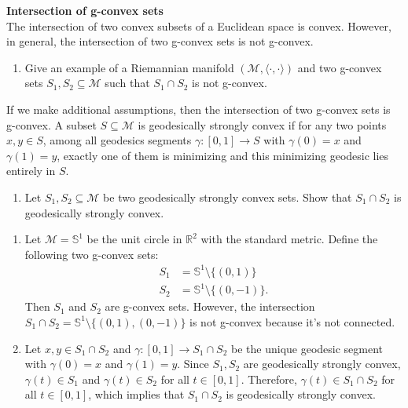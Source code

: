 \documentclass[en, oneside]{assignment}
\begin{document}
\begin{prob} \textbf{Intersection of g-convex sets}\\
    The intersection of two convex subsets of a Euclidean space is convex. However, in general, the intersection of two g-convex sets is not g-convex.
    \begin{enumerate}[label=(\arabic*)]
        \item Give an example of a Riemannian manifold $(\mathcal M, \langle \cdot, \cdot \rangle)$ and 
        two g-convex sets $S_1, S_2 \subseteq \mathcal M$ such that $S_1 \cap S_2$ is not g-convex.
    \end{enumerate}
    If we make additional assumptions, then the intersection of two g-convex sets is g-convex. 
    A subset $S \subseteq \mathcal M$ is geodesically strongly convex if for any two points $x, y \in S$, 
    among all geodesics segments $\gamma : [0, 1] \rightarrow S$ with $\gamma(0) = x$ and $\gamma(1) = y$, 
    exactly one of them is minimizing and this minimizing geodesic lies entirely in $S$.
    \begin{enumerate}[label=(\arabic*), resume]
        \item Let $S_1, S_2 \subseteq \mathcal M$ be two geodesically strongly convex sets. Show that $S_1 \cap S_2$ is geodesically strongly convex.
    \end{enumerate}
    
\end{prob}

\begin{sol}
    \begin{enumerate}[label=(\arabic*)]
        \item Let $\mathcal M = \mathbb S ^1$ be the unit circle in $\mathbb R^2$ with the standard metric. Define the following two g-convex sets:
        \begin{align*}
            S_1 &= \mathbb S ^1 \setminus \{(0, 1)\}\\
            S_2 &= \mathbb S ^1 \setminus \{(0, -1)\}.
        \end{align*}
        Then $S_1$ and $S_2$ are g-convex sets. However, the intersection $S_1 \cap S_2 = \mathbb S ^1 \setminus \{(0, 1), (0, -1)\}$ is not g-convex 
        because it's not connected.
        \item Let $x, y \in S_1 \cap S_2$ and $\gamma : [0, 1] \rightarrow S_1 \cap S_2$ be the unique geodesic segment with $\gamma(0) = x$ and $\gamma(1) = y$.
        Since $S_1, S_2$ are geodesically strongly convex, $\gamma(t) \in S_1$ and $\gamma(t) \in S_2$ for all $t \in [0, 1]$. 
        Therefore, $\gamma(t) \in S_1 \cap S_2$ for all $t \in [0, 1]$, which implies that $S_1 \cap S_2$ is geodesically strongly convex.
    \end{enumerate}
\end{sol}
\end{document}
